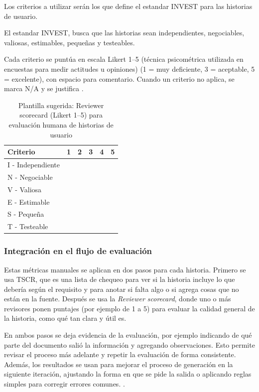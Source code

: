 Los criterios a utilizar serán los que define el estandar INVEST para las historias de usuario.

El estandar INVEST, busca que las historias sean independientes, negociables, valiosas, estimables, pequeñas y testeables. 

Cada criterio se puntúa en escala Likert 1--5 (técnica psicométrica utilizada en encuestas para medir actitudes u opiniones) (1 = muy deficiente, 3 = aceptable, 5 = excelente), con espacio para comentario. Cuando un criterio no aplica, se marca N/A y se justifica \cite{yu2026evaluating_genai_quality_multicase}.

\begin{table}[h!]
\centering
\begin{tabular}{|p{5.3cm}|c|c|c|c|c|}
\hline
\textbf{Criterio} & \textbf{1} & \textbf{2} & \textbf{3} & \textbf{4} & \textbf{5} \\
\hline
I - Independiente &  &  &  &  &  \\
\hline
N - Negociable &  &  &  &  &   \\
\hline
V - Valiosa &  &  &  &  &    \\
\hline
E - Estimable &  &  &  &  &    \\
\hline
S - Pequeña &  &  &  &  &    \\
\hline
T - Testeable &  &  &  &  &    \\
\hline
\end{tabular}
\caption{Plantilla sugerida: Reviewer scorecard (Likert 1--5) para evaluación humana de historias de usuario}
\end{table}

\subsubsection{Integración en el flujo de evaluación}
Estas métricas manuales se aplican en dos pasos para cada historia. Primero se usa TSCR, que es una lista de chequeo para ver si la historia incluye lo que debería según el requisito y para anotar si falta algo o si agrega cosas que no están en la fuente. Después se usa la \textit{Reviewer scorecard}, donde uno o más revisores ponen puntajes (por ejemplo de 1 a 5) para evaluar la calidad general de la historia, como qué tan clara y útil es.

En ambos pasos se deja evidencia de la evaluación, por ejemplo indicando de qué parte del documento salió la información y agregando observaciones. Esto permite revisar el proceso más adelante y repetir la evaluación de forma consistente. Además, los resultados se usan para mejorar el proceso de generación en la siguiente iteración, ajustando la forma en que se pide la salida o aplicando reglas simples para corregir errores comunes.
\cite{yu2026evaluating_genai_quality_multicase}.

